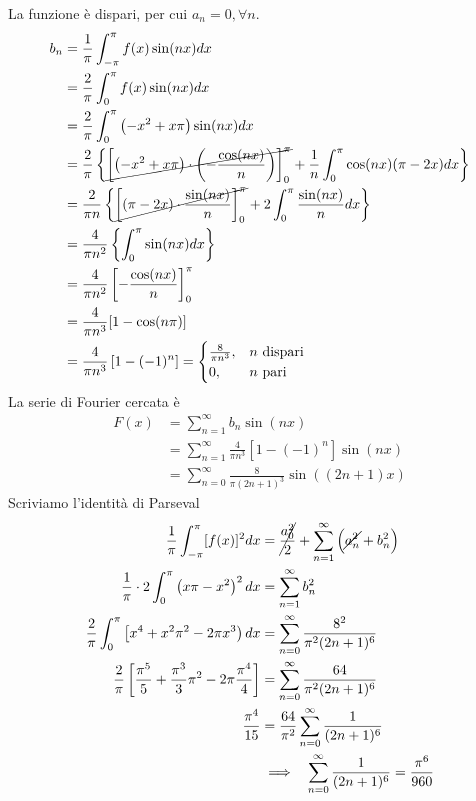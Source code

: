 La funzione è dispari, per cui $a_{n} = 0,\forall n$.
\begin{align*}
b_{n} & = \frac{1}{\pi }\int ^{\pi }_{ - \pi } f(x)\sin(nx) dx\\
 & = \frac{2}{\pi }\int ^{\pi }_{0} f(x)\sin(nx) dx\\
 & = \frac{2}{\pi }\int ^{\pi }_{0}\left(- x^{2} + x\pi \right)\sin(nx) dx\\
 & = \frac{2}{\pi }\left\{\cancel{\left[\left(- x^{2} + x\pi \right) \cdot \left(- \frac{\cos(nx)}{n}\right)\right]^{\pi }_{0}} + \frac{1}{n}\int ^{\pi }_{0}\cos(nx)(\pi - 2x) dx\right\}\\
 & = \frac{2}{\pi n}\left\{\cancel{\left[(\pi - 2x) \cdot \frac{\sin(nx)}{n}\right]^{\pi }_{0}} + 2\int ^{\pi }_{0}\frac{\sin(nx)}{n} dx\right\}\\
 & = \frac{4}{\pi n^{2}}\left\{\int ^{\pi }_{0}\sin(nx) dx\right\}\\
 & = \frac{4}{\pi n^{2}}\left[ - \frac{\cos(nx)}{n}\right]^{\pi }_{0}\\
 & = \frac{4}{\pi n^{3}}[ 1 - \cos(n\pi)]\\
 & = \frac{4}{\pi n^{3}}\left[ 1 - (- 1)^{n}\right] = 
 \begin{cases}
\frac{8}{\pi n^{3}} , & n\ \text{dispari}\\
0, & n\ \text{pari}
\end{cases}
\end{align*}
La serie di Fourier cercata è
\begin{align*}
F(x) & = \sum\limits ^{\infty }_{n = 1} b_{n}\sin(nx)\\
 & = \sum\limits ^{\infty }_{n = 1}\frac{4}{\pi n^{3}}\left[ 1 - (- 1)^{n}\right]\sin(nx)\\
 & = \sum\limits ^{\infty }_{n = 0}\frac{8}{\pi (2n + 1)^{3}}\sin((2n + 1) x)
\end{align*}
Scriviamo l'identità di Parseval
\begin{align*}
\frac{1}{\pi }\int ^{\pi }_{ - \pi }[ f(x)]^{2} dx & = \cancel{\frac{a^{2}_{0}}{2}} + \sum\limits ^{\infty }_{n = 1}\left(\cancel{a^{2}_{n}} + b^{2}_{n}\right)\\
\frac{1}{\pi } \cdot 2\int ^{\pi }_{0}\left(x\pi - x^{2}\right)^{2} dx & = \sum\limits ^{\infty }_{n = 1} b^{2}_{n}\\
\frac{2}{\pi }\int ^{\pi }_{0}\left[ x^{4} + x^{2} \pi ^{2} - 2\pi x^{3}\right) dx & = \sum\limits ^{\infty }_{n = 0}\frac{8^{2}}{\pi ^{2}(2n + 1)^{6}}\\
\frac{2}{\pi }\left[\frac{\pi ^{5}}{5} + \frac{\pi ^{3}}{3} \pi ^{2} - 2\pi \frac{\pi ^{4}}{4}\right] & = \sum\limits ^{\infty }_{n = 0}\frac{64}{\pi ^{2}(2n + 1)^{6}}\\
\frac{\pi ^{4}}{15} & = \frac{64}{\pi ^{2}}\sum\limits ^{\infty }_{n = 0}\frac{1}{(2n + 1)^{6}}\\
 & \implies \ \ \sum\limits ^{\infty }_{n = 0}\frac{1}{(2n + 1)^{6}} = \frac{\pi ^{6}}{960}
\end{align*}

